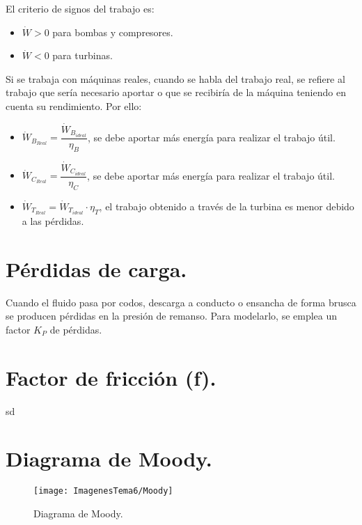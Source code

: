El criterio de signos del trabajo es:
\begin{itemize}
	\item $\dot{W}>0$ para bombas y compresores.
	\item $\dot{W}<0$ para turbinas.
\end{itemize}


Si se trabaja con máquinas reales, cuando se habla del trabajo real, se refiere al trabajo que sería necesario aportar o que se recibiría de la máquina teniendo en cuenta su rendimiento. Por ello:
\begin{itemize}
	\item $\dot{W}_{B_{Real}}=\dfrac{\dot{W}_{B_{ideal}}}{\eta_B}$, se debe aportar más energía para realizar el trabajo útil.
	\item $\dot{W}_{C_{Real}}=\dfrac{\dot{W}_{C_{ideal}}}{\eta_C}$, se debe aportar más energía para realizar el trabajo útil.
	\item $\dot{W}_{T_{Real}}=\dot{W}_{T_{ideal}}\cdot \eta_T$, el trabajo obtenido a través de la turbina es menor debido a las pérdidas.
\end{itemize}
\section{Pérdidas de carga.}
Cuando el fluido pasa por codos, descarga a conducto o ensancha de forma brusca se producen pérdidas en la presión de remanso. Para modelarlo, se emplea un factor $K_P$ de pérdidas.
\section{Factor de fricción (f).}
sd
\section{Diagrama de Moody.}
\begin{figure}[H]
	\centering
	\texttt{[image: ImagenesTema6/Moody]}
	\caption{Diagrama de Moody.}
	\label{fig:moody}
\end{figure}
